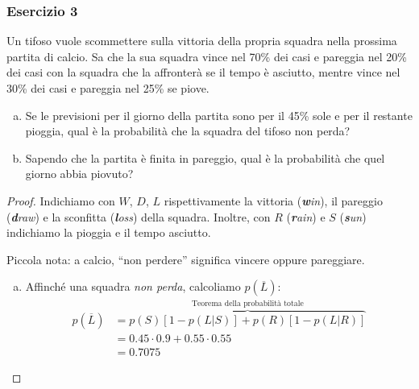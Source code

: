 \documentclass{beamer}
\begin{document}
\begin{frame}[fragile]
	\frametitle{Esercizio 3}

	\begin{exercise}

		Un tifoso vuole scommettere sulla vittoria della propria squadra nella prossima partita di calcio. Sa che la sua squadra vince nel 70\% dei casi e pareggia nel 20\% dei casi con la squadra che la affronterà se il tempo è asciutto, mentre vince nel 30\% dei casi e pareggia nel 25\% se piove.

		\begin{enumerate}[(a)]
			\item Se le previsioni per il giorno della partita sono per il 45\% sole e per il restante pioggia, qual è la probabilità che la squadra del tifoso non perda?
			\item Sapendo che la partita è finita in pareggio, qual è la probabilità che quel giorno abbia piovuto?
		\end{enumerate}
	\end{exercise}
\end{frame}

\begin{frame}[fragile]
	\begin{proof}\renewcommand{\qedsymbol}{$\square$}

		Indichiamo con $W$, $D$, $L$ rispettivamente la vittoria (\textit{\textbf{w}in}), il pareggio (\textit{\textbf{d}raw}) e la sconfitta (\textit{\textbf{l}oss}) della squadra. Inoltre, con $R$  (\textit{\textbf{r}ain}) e $S$  (\textit{\textbf{s}un}) indichiamo la pioggia e il tempo asciutto.

		\medskip

		Piccola nota: a calcio, ``non perdere'' significa vincere oppure pareggiare.
		
		\begin{enumerate}[(a)]
			\item Affinché una squadra \textit{non perda}, calcoliamo $p(\overline{L})$: \begin{align*}
				      p(\overline{L}) & = \overbrace{p(S)\left[1 - p(L|S) \right] + p(R)\left[1 - p(L|R) \right]}^{\text{Teorema della probabilità totale}} \\
				      & = 0.45\cdot0.9+0.55\cdot0.55 \\
				      & = 0.7075
			      \end{align*}
		\end{enumerate}
	\end{proof}
\end{frame}
\end{document}
